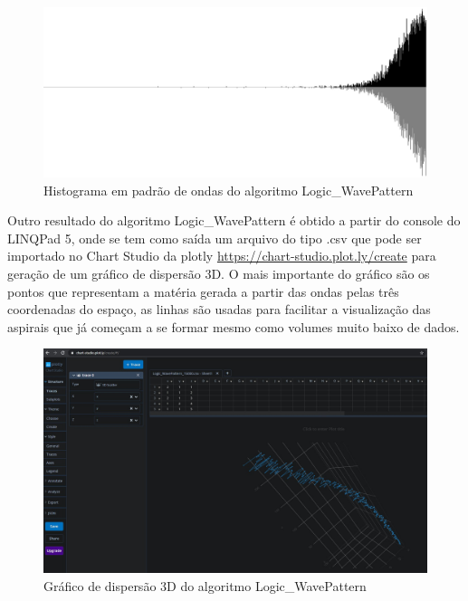 \begin{apendicesenv}
\begin{figure}[H]
\caption{Histograma em padrão de ondas do algoritmo Logic\_WavePattern}
\label{fig:logic_wavepattern_15000}
\centering
\includegraphics[scale=.25]{sections/images/logic_wavepattern_15000.jpg}
\end{figure}

Outro resultado do algoritmo Logic\_WavePattern é obtido a partir do console do LINQPad 5, onde se tem como saída um arquivo do tipo .csv que pode ser importado no Chart Studio da plotly \url{https://chart-studio.plot.ly/create} para geração de um gráfico de dispersão 3D. O mais importante do gráfico são os pontos que representam a matéria gerada a partir das ondas pelas três coordenadas do espaço, as linhas são usadas para facilitar a visualização das aspirais que já começam a se formar mesmo como volumes muito baixo de dados. 

\begin{figure}[H]
\caption{Gráfico de dispersão 3D do algoritmo Logic\_WavePattern}
\label{fig:plotly_3DScatter}
\centering
\includegraphics[scale=.35]{sections/images/plotly_3DScatter.jpg}
\end{figure}


\end{apendicesenv}
